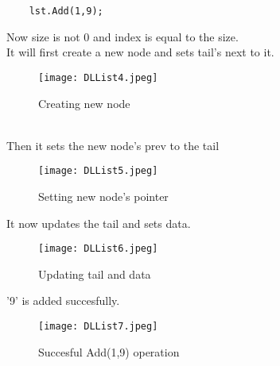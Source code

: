 \documentclass[11pt,fleqn]{book} %
\begin{document}
\begin{example}
	\begin{lstlisting}
	lst.Add(1,9);
	\end{lstlisting}
	Now size is not 0 and index is equal to the size.\\
	It will first create a new node and sets tail's next to it.
	\begin{figure}[H]
		\centering
		\texttt{[image: DLList4.jpeg]}
		\caption{Creating new node}
	\end{figure} ~\\
	Then it sets the new node's prev to the tail
	\begin{figure}[H]
		\centering
		\texttt{[image: DLList5.jpeg]}
		\caption{Setting new node's pointer}
	\end{figure}
	It now updates the tail and sets data.
	\begin{figure}[H]
		\centering
		\texttt{[image: DLList6.jpeg]}
		\caption{Updating tail and data}
	\end{figure}
	'9' is added succesfully.
	{\begin{figure}[H]
			\centering
			\texttt{[image: DLList7.jpeg]}
			\caption{Succesful Add(1,9) operation}
	\end{figure}}
\end{example}
\end{document}
